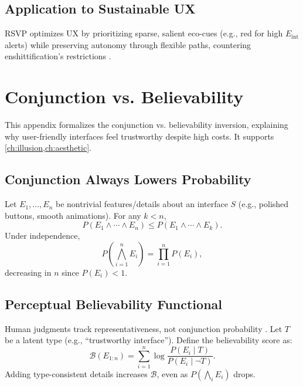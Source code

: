\documentclass[openany]{book}
\newcommand{\Eint}{E_{\mathrm{int}}} %
\begin{document}
\section{Application to Sustainable UX}
\label{sec:rsvp-application}
RSVP optimizes UX by prioritizing sparse, salient eco-cues (e.g., red for high $\Eint$ alerts) while preserving autonomy through flexible paths, countering enshittification’s restrictions \citep{doctorow2022}.

\chapter{Conjunction vs. Believability}
\label{app:conjunction}

This appendix formalizes the conjunction vs. believability inversion, explaining why user-friendly interfaces feel trustworthy despite high costs. It supports \cref{ch:illusion,ch:aesthetic}.

\section{Conjunction Always Lowers Probability}
\label{sec:conj-prob}
Let $E_1,\dots,E_n$ be nontrivial features/details about an interface $S$ (e.g., polished buttons, smooth animations). For any $k<n$,
\begin{equation}
\label{eq:conj-prob}
P(E_1 \land \cdots \land E_n) \leq P(E_1 \land \cdots \land E_k).
\end{equation}
Under independence,
\begin{equation}
\label{eq:conj-indep}
P\!\left(\bigwedge_{i=1}^n E_i\right) = \prod_{i=1}^n P(E_i),
\end{equation}
decreasing in $n$ since $P(E_i) < 1$.

\section{Perceptual Believability Functional}
\label{sec:conj-believability}
Human judgments track representativeness, not conjunction probability \citep{tversky1983}. Let $T$ be a latent type (e.g., \textquotedblleft trustworthy interface\textquotedblright). Define the believability score as:
\begin{equation}
\label{eq:believability-functional}
\mathcal{B}(E_{1:n}) = \sum_{i=1}^n \log \frac{P(E_i \mid T)}{P(E_i \mid \neg T)}.
\end{equation}
Adding type-consistent details increases $\mathcal{B}$, even as $P(\bigwedge_i E_i)$ drops.
\end{document}
